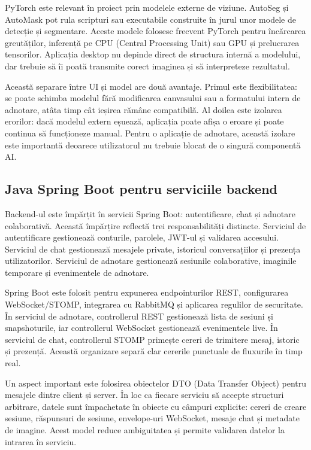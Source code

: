 PyTorch este relevant în proiect prin modelele externe de viziune.
AutoSeg și AutoMask pot rula scripturi sau executabile construite în jurul unor modele de detecție și segmentare.
Aceste modele folosesc frecvent PyTorch pentru încărcarea greutăților, inferență pe CPU (Central Processing Unit) sau GPU și prelucrarea tensorilor.
Aplicația desktop nu depinde direct de structura internă a modelului, dar trebuie să îi poată transmite corect imaginea și să interpreteze rezultatul.

Această separare între UI și model are două avantaje.
Primul este flexibilitatea: se poate schimba modelul fără modificarea canvasului sau a formatului intern de adnotare, atâta timp cât ieșirea rămâne compatibilă.
Al doilea este izolarea erorilor: dacă modelul extern eșuează, aplicația poate afișa o eroare și poate continua să funcționeze manual.
Pentru o aplicație de adnotare, această izolare este importantă deoarece utilizatorul nu trebuie blocat de o singură componentă AI.

\subsection{Java Spring Boot pentru serviciile backend}
\label{subsec:java-spring}

Backend-ul este împărțit în servicii Spring Boot: autentificare, chat și adnotare colaborativă.
Această împărțire reflectă trei responsabilități distincte.
Serviciul de autentificare gestionează conturile, parolele, JWT-ul și validarea accesului.
Serviciul de chat gestionează mesajele private, istoricul conversațiilor și prezența utilizatorilor.
Serviciul de adnotare gestionează sesiunile colaborative, imaginile temporare și evenimentele de adnotare.

Spring Boot este folosit pentru expunerea endpointurilor REST, configurarea WebSocket/STOMP, integrarea cu RabbitMQ și aplicarea regulilor de securitate.
În serviciul de adnotare, controllerul REST gestionează lista de sesiuni și snapshoturile, iar controllerul WebSocket gestionează evenimentele live.
În serviciul de chat, controllerul STOMP primește cereri de trimitere mesaj, istoric și prezență.
Această organizare separă clar cererile punctuale de fluxurile în timp real.

Un aspect important este folosirea obiectelor DTO (Data Transfer Object) pentru mesajele dintre client și server.
În loc ca fiecare serviciu să accepte structuri arbitrare, datele sunt împachetate în obiecte cu câmpuri explicite: cereri de creare sesiune, răspunsuri de sesiune, envelope-uri WebSocket, mesaje chat și metadate de imagine.
Acest model reduce ambiguitatea și permite validarea datelor la intrarea în serviciu.

